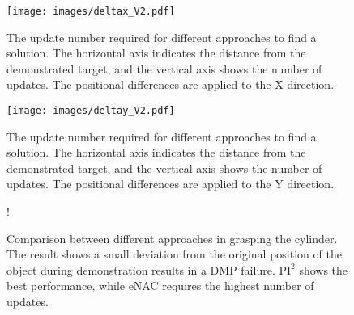 \documentclass[letterpaper, 10 pt, conference]{ieeeconf}  %
\begin{document}
\begin{figure}[b]
  \centering
  \texttt{[image: images/deltax\_V2.pdf]}
  \caption[The update number required for different approaches to find a solution.]{The update number required for different approaches to find a solution. The horizontal axis indicates the distance from the demonstrated target, and the vertical axis shows the number of updates. The positional differences are applied to the X direction.}
      \label{fig:NumberUpdatesBoxX}
      \vspace{-3mm}
\end{figure}
\begin{figure}[h]
   \centering
    \texttt{[image: images/deltay\_V2.pdf]}
    \caption[The update number required for different approaches to find a solution.]{The update number required for different approaches to find a solution. The horizontal axis indicates the distance from the demonstrated target, and the vertical axis shows the number of updates. The positional differences are applied to the Y direction.}
      \label{fig:NumberUpdatesBoxY}
    \vspace{-3mm}
\end{figure}

\begin{figure}[b]
    \centering
        \vspace{-3mm}
     \resizebox {\linewidth} {!} {
    
    }
    \caption[Comparison between different approaches in grasping the cylinder.]{Comparison between  different approaches in grasping the cylinder. The result shows a small deviation from the original position of the object during demonstration results in a DMP failure. $\textrm{PI}^2$ shows the best performance, while eNAC requires the highest number of updates.}

    \label{fig:Certain_Cylinder}
\end{figure}

%     

\end{document}
